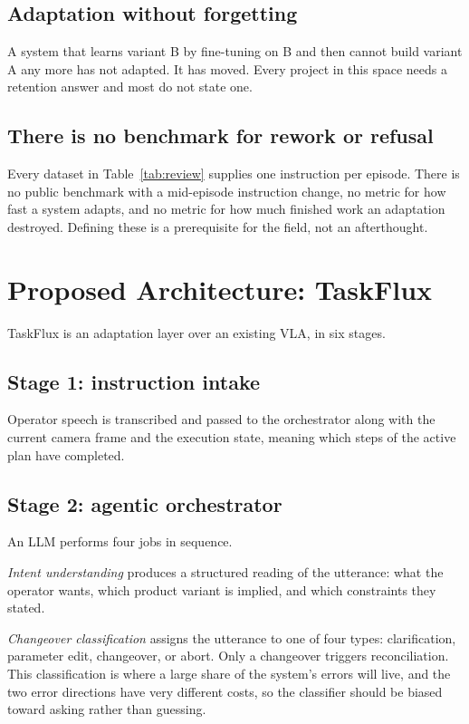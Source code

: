 \documentclass[conference]{IEEEtran}
\begin{document}
\subsection{Adaptation without forgetting}

A system that learns variant B by fine-tuning on B and then cannot build
variant A any more has not adapted. It has moved. Every project in this
space needs a retention answer and most do not state one.

\subsection{There is no benchmark for rework or refusal}

Every dataset in Table~\ref{tab:review} supplies one instruction per
episode. There is no public benchmark with a mid-episode instruction
change, no metric for how fast a system adapts, and no metric for how
much finished work an adaptation destroyed. Defining these is a
prerequisite for the field, not an afterthought.

\section{Proposed Architecture: TaskFlux}
\label{sec:arch}

TaskFlux is an adaptation layer over an existing VLA, in six stages.

\subsection{Stage 1: instruction intake}

Operator speech is transcribed and passed to the orchestrator along with
the current camera frame and the execution state, meaning which steps of
the active plan have completed.

\subsection{Stage 2: agentic orchestrator}

An LLM performs four jobs in sequence.

\emph{Intent understanding} produces a structured reading of the
utterance: what the operator wants, which product variant is implied, and
which constraints they stated.

\emph{Changeover classification} assigns the utterance to one of four
types: clarification, parameter edit, changeover, or abort. Only a
changeover triggers reconciliation. This classification is where a large
share of the system's errors will live, and the two error directions have
very different costs, so the classifier should be biased toward asking
rather than guessing.
\end{document}
